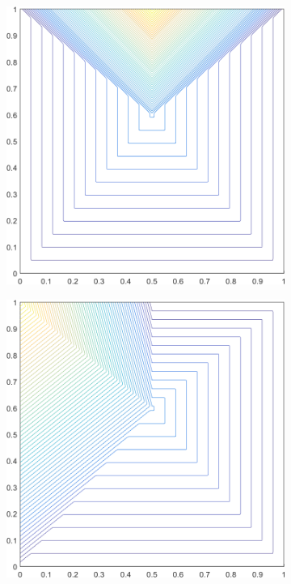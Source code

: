 \begin{figure}
\centering
	\begin{subfigure}[b]{0.39\textwidth}
		\centering
		\includegraphics[width=\textwidth]{figures/sec_BF/deg_square_PWLD1_contour_b4.png}
		\caption{}
	\end{subfigure}
	\vfill
	\begin{subfigure}[b]{0.39\textwidth}
		\centering
		\includegraphics[width=\textwidth]{figures/sec_BF/deg_square_PWLD1_contour_b5.png}

\end{subfigure}
\end{figure}
